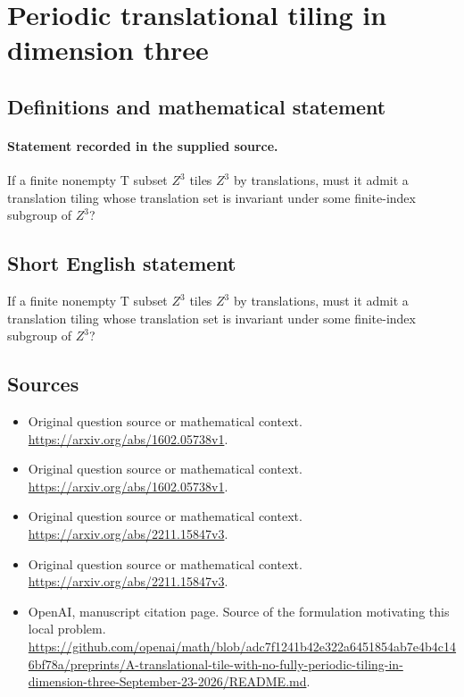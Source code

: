 \documentclass[11pt]{article}
\begin{document}
\section*{Periodic translational tiling in dimension three}\label{statement}
\subsection{Definitions and mathematical statement}
\paragraph{Statement recorded in the supplied source.}
If a finite nonempty T subset $Z^3$ tiles $Z^3$ by translations, must it admit a translation tiling whose translation set is invariant under some finite-index subgroup of $Z^3$?
\subsection{Short English statement}
If a finite nonempty T subset $Z^3$ tiles $Z^3$ by translations, must it admit a translation tiling whose translation set is invariant under some finite-index subgroup of $Z^3$?
\subsection{Sources}
\begin{itemize}
\item[S1] Original question source or mathematical context.
\url{https://arxiv.org/abs/1602.05738v1}.
\item[S2] Original question source or mathematical context.
\url{https://arxiv.org/abs/1602.05738v1}.
\item[S3] Original question source or mathematical context.
\url{https://arxiv.org/abs/2211.15847v3}.
\item[S4] Original question source or mathematical context.
\url{https://arxiv.org/abs/2211.15847v3}.
\item[S5] OpenAI, manuscript citation page. Source of the formulation motivating this local problem.
\url{https://github.com/openai/math/blob/adc7f1241b42e322a6451854ab7e4b4c146bf78a/preprints/A-translational-tile-with-no-fully-periodic-tiling-in-dimension-three-September-23-2026/README.md}.
\end{itemize}
\end{document}
